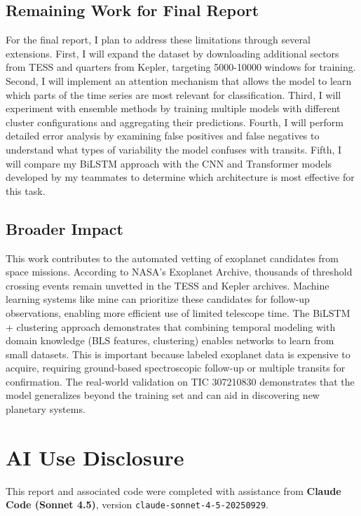 \documentclass[letterpaper]{article}
\begin{document}
\subsection{Remaining Work for Final Report}

For the final report, I plan to address these limitations through several extensions. First, I will expand the dataset by downloading additional sectors from TESS and quarters from Kepler, targeting 5000-10000 windows for training. Second, I will implement an attention mechanism that allows the model to learn which parts of the time series are most relevant for classification. Third, I will experiment with ensemble methods by training multiple models with different cluster configurations and aggregating their predictions. Fourth, I will perform detailed error analysis by examining false positives and false negatives to understand what types of variability the model confuses with transits. Fifth, I will compare my BiLSTM approach with the CNN and Transformer models developed by my teammates to determine which architecture is most effective for this task.

\subsection{Broader Impact}

This work contributes to the automated vetting of exoplanet candidates from space missions. According to NASA's Exoplanet Archive, thousands of threshold crossing events remain unvetted in the TESS and Kepler archives. Machine learning systems like mine can prioritize these candidates for follow-up observations, enabling more efficient use of limited telescope time. The BiLSTM + clustering approach demonstrates that combining temporal modeling with domain knowledge (BLS features, clustering) enables networks to learn from small datasets. This is important because labeled exoplanet data is expensive to acquire, requiring ground-based spectroscopic follow-up or multiple transits for confirmation. The real-world validation on TIC 307210830 demonstrates that the model generalizes beyond the training set and can aid in discovering new planetary systems.

\section*{AI Use Disclosure}

This report and associated code were completed with assistance from \textbf{Claude Code (Sonnet 4.5)}, version \texttt{claude-sonnet-4-5-20250929}.
\end{document}

